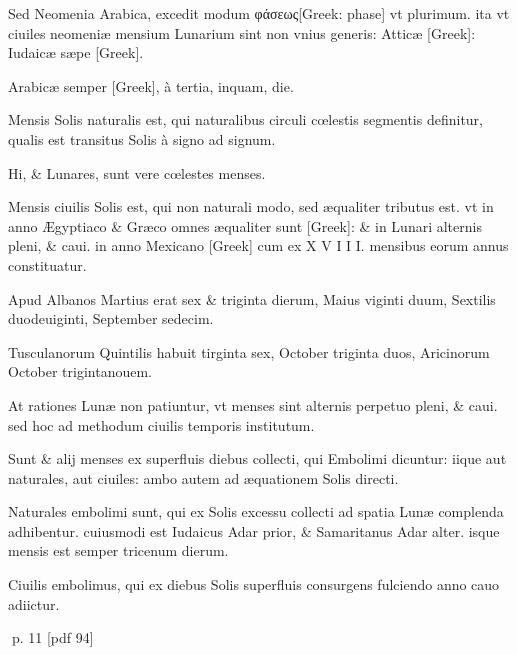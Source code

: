 \begin{parnumbers}
Sed Neomenia Arabica, excedit modum \textgreek{φάσεως[Greek: phase]} vt plurimum. ita vt ciuiles neomeniæ mensium Lunarium sint non vnius generis: Atticæ  \textgreek{[Greek]}: Iudaicæ sæpe \textgreek{[Greek]}.

Arabicæ semper \textgreek{[Greek]}, à tertia, inquam, die.

Mensis Solis naturalis est, qui naturalibus circuli cœlestis segmentis definitur, qualis est transitus Solis à signo ad signum.

Hi, \& Lunares, sunt vere cœlestes menses.

Mensis ciuilis Solis est, qui non naturali modo, sed æqualiter tributus est. vt in anno Ægyptiaco \& Græco omnes æqualiter sunt \textgreek{[Greek]}: \& in Lunari alternis pleni, \& caui. in anno Mexicano \textgreek{[Greek]} cum ex X V I I I. mensibus eorum annus constituatur.

Apud Albanos Martius erat sex \& triginta dierum, Maius viginti duum, Sextilis duodeuiginti, September sedecim.

Tusculanorum Quintilis habuit tirginta sex, October triginta duos, Aricinorum October trigintanouem.

At rationes Lunæ non patiuntur, vt menses sint alternis perpetuo pleni, \& caui. sed hoc ad methodum ciuilis temporis institutum.

Sunt \& alij menses ex superfluis diebus collecti, qui Embolimi dicuntur: iique aut naturales, aut ciuiles: ambo autem ad æquationem Solis directi.

Naturales embolimi sunt, qui ex Solis excessu collecti ad spatia Lunæ complenda adhibentur. cuiusmodi est Iudaicus Adar prior, \& Samaritanus Adar alter. isque mensis est semper tricenum dierum.

Ciuilis embolimus, qui ex diebus Solis superfluis consurgens fulciendo anno cauo adiictur.

\end{parnumbers}
\clearpage
p. 11 [pdf 94]

